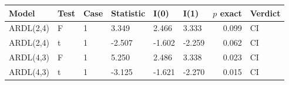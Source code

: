 \begin{tabular}{llllllrl}
\toprule
Model & Test & Case & Statistic & I(0) & I(1) & $p$ exact & Verdict \\
\midrule
ARDL(2,4) & F & 1 & 3.349 & 2.466 & 3.333 & 0.099 & CI \\
ARDL(2,4) & t & 1 & -2.507 & -1.602 & -2.259 & 0.062 & CI \\
ARDL(4,3) & F & 1 & 5.250 & 2.486 & 3.338 & 0.023 & CI \\
ARDL(4,3) & t & 1 & -3.125 & -1.621 & -2.270 & 0.015 & CI \\
\bottomrule
\end{tabular}


